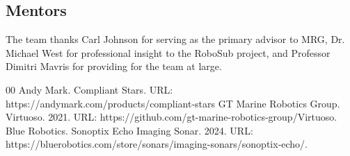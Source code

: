 \documentclass[conference]{IEEEtran}
\begin{document}
\subsection{Mentors}
The team thanks Carl Johnson for serving as the primary advisor to MRG, Dr. Michael West for professional insight to the RoboSub project, and Professor Dimitri Mavris for providing for the team at large.

\begin{thebibliography}{00}
 Andy Mark. Compliant Stars. URL: https://andymark.com/products/compliant-stars
 GT Marine Robotics Group. Virtuoso. 2021. URL: https://github.com/gt-marine-robotics-group/Virtuoso.
 Blue Robotics. Sonoptix Echo Imaging Sonar. 2024.
URL: https://bluerobotics.com/store/sonars/imaging-sonars/sonoptix-echo/.
\end{thebibliography}

\clearpage






\end{document}
